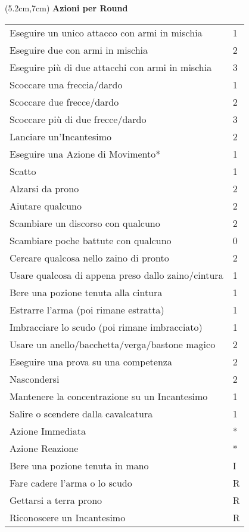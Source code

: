 \documentclass[a4paper,12 pt,openany]{book}
\begin{document}
\begin{textblock*}{10.5cm}(5.2cm,7cm) %
\textbf{Azioni per Round}

	\begin{tabular}{ll}
		Eseguire un unico attacco con armi in mischia      & 1\\
		Eseguire due con armi in mischia			       & 2\\
		Eseguire più di due attacchi con armi in mischia  & 3\\
		Scoccare una freccia/dardo                         & 1\\
		Scoccare due frecce/dardo                          & 2\\
		Scoccare più di due frecce/dardo                  & 3\\
		Lanciare un'Incantesimo                            & 2\\
		Eseguire una Azione di Movimento*                  & 1\\
		Scatto   						                   & 1\\
		Alzarsi da prono                                   & 2\\
		Aiutare qualcuno                                   & 2\\
		Scambiare un discorso con qualcuno                 & 2\\
		Scambiare poche battute con qualcuno               & 0\\
		Cercare qualcosa nello zaino di pronto             & 2\\
		Usare qualcosa di appena preso dallo zaino/cintura & 1\\
		Bere una pozione tenuta alla cintura               & 1\\
		Estrarre l'arma (poi rimane estratta)              & 1\\
		Imbracciare lo scudo (poi rimane imbracciato)      & 1\\
		Usare un anello/bacchetta/verga/bastone magico     & 2\\
		Eseguire una prova su una competenza               & 2\\
		Nascondersi										   & 2\\
		Mantenere la concentrazione su un Incantesimo      & 1\\
		Salire o scendere dalla cavalcatura				   & 1\\
		Azione Immediata                                   & {*}\\
		Azione Reazione                                    & {*}\\
		Bere una pozione tenuta in mano     	           & I\\
		Fare cadere l'arma o lo scudo					   & R\\
		Gettarsi a terra prono							   & R\\
		Riconoscere un Incantesimo						   & R\\
	\end{tabular}

	\end{textblock*}
\end{document}
